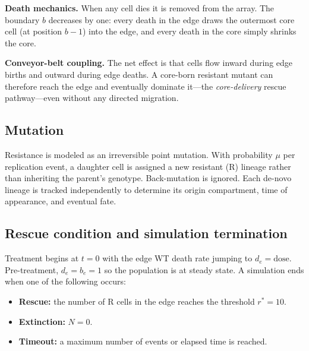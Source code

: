 \documentclass[12pt]{article}
\newcommand{\bEdge}{b_e}
\newcommand{\dEdge}{d_e}
\begin{document}
\textbf{Death mechanics.} When any cell dies it is removed from the array.
The boundary $b$ decreases by one: every death in the edge draws the outermost
core cell (at position $b-1$) into the edge, and every death in the core
simply shrinks the core.

\textbf{Conveyor-belt coupling.} The net effect is that cells flow inward
during edge births and outward during edge deaths. A core-born resistant
mutant can therefore reach the edge and eventually dominate it---the
\emph{core-delivery} rescue pathway---even without any directed migration.

\subsection{Mutation}

Resistance is modeled as an irreversible point mutation. With probability
$\mu$ per replication event, a daughter cell is assigned a new resistant (R)
lineage rather than inheriting the parent's genotype. Back-mutation is
ignored. Each de-novo lineage is tracked independently to determine its
origin compartment, time of appearance, and eventual fate.

\subsection{Rescue condition and simulation termination}

Treatment begins at $t = 0$ with the edge WT death rate jumping to
$\dEdge = \text{dose}$. Pre-treatment, $\dEdge = \bEdge = 1$ so the
population is at steady state. A simulation ends when one of the following
occurs:
\begin{itemize}
    \item \textbf{Rescue:} the number of R cells in the edge reaches the
        threshold $r^* = 10$.
    \item \textbf{Extinction:} $N = 0$.
    \item \textbf{Timeout:} a maximum number of events or elapsed time
        is reached.
\end{itemize}
\end{document}
